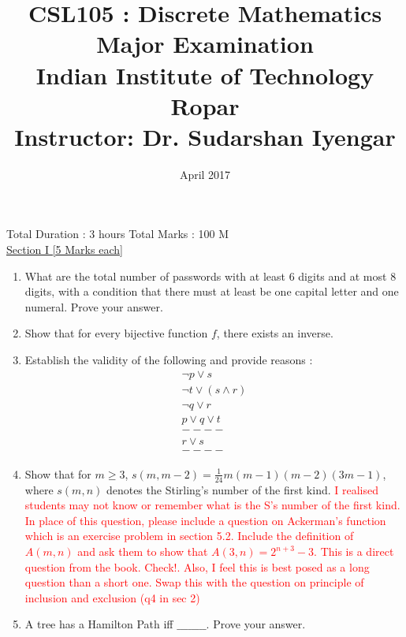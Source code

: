 \documentclass{article}
\title{CSL105 : Discrete Mathematics\\
\large{Major Examination}\\
\large{Indian Institute of Technology Ropar}\\
\small{Instructor: Dr. Sudarshan Iyengar}
}
\date{April 2017}
\begin{document}
\maketitle
Total Duration : 3 hours \hfill Total Marks : 100 M\\

\underline{\large{Section I \hspace*{10cm} [5 Marks each]}}
\begin{enumerate} 






\item What are the total number of passwords with at least 6 digits and at most 8 digits, with a condition that there must at least be one capital letter and one numeral. Prove your answer.

\item Show that for every bijective function $f$, there exists an inverse.

\item Establish the validity of the following and provide reasons :
  \begin{align*}
			\neg p \lor s\\
			\neg t \lor (s \land r )\\
			\neg q \lor r\\
			p\lor q \lor t\\
			----\\
			r\lor s\\
			----
		\end{align*}
 
 \item Show that for $m \geq 3$,  $s(m,m-2) = \frac{1}{24}m(m-1)(m-2)(3m-1)$,
	 where $s(m,n)$ denotes the Stirling's number of the first kind. \textcolor{red}{I realised students may not know or remember what is the S's number of the first kind. In place of this question, please include a question on Ackerman's function which is an exercise problem in section 5.2. Include the definition of $A(m,n)$  and ask them to show that $A(3,n)=2^{n+3}-3$. This is a direct question from the book. Check!. Also, I feel this is best posed as a long question than a short one. Swap this with the question on principle of inclusion and exclusion (q4 in sec 2)}
 
 \item A tree has a Hamilton Path iff $\_\_\_\_\_\_\_\_ $. Prove your answer. 
 

\end{enumerate}
\end{document}
